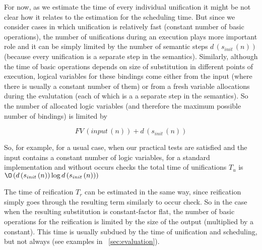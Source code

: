For now, as we estimate the time of every individual unification it might be not clear how it relates to the estimation for the scheduling time. But since we consider cases in which unification
is relatively fast (constant number of basic operations), the number of unifications during an execution plays more important role and it can be simply limited by the number of semantic
steps $d\,(s_{init}\,(n))$ (because every unification is a separate step in the semantics). Similarly, although the time of basic operations depends on size of substitution in different points
of execution, logical variables for these bindings come either from the input (where there is usually a constant number of them) or from a fresh variable allocations during the evalutation
(each of which is a a separate step in the semantics). So the number of allocated logic variables (and therefore the maximum possible number of bindings) is limited by

\[
FV\,(input\,(n)) + d\,(s_{init}\,(n))
\]

So, for example, for a usual case, when our practical tests are satisfied and the input contains a constant number of logic variables, for a standard implementation and without occurs checks
the total time of unifications $T_u$ is $\O\,(d\,(s_{init}\,(n)) \log d\,(s_{init}\,(n)))$

The time of reification $T_r$ can be estimated in the same way, since reification simply goes through the resulting term similarly to occur check. So in the case when the resulting
substitution is constant-factor flat, the number of basic operations for the reification is limited by the size of the output (multiplied by a constant). This time is usually subdued by
the time of unification and scheduling, but not always (see examples in \sectionword~\ref{sec:evaluation}).


